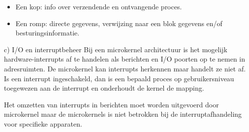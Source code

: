\begin{itemize}
\item Een kop: info over verzendende en ontvangende proces.
\item Een romp: directe gegevens, verwijzing naar een blok gegevens en/of besturingsinformatie.
\end{itemize}

c)	I/O en interruptbeheer
Bij een microkernel architectuur is het mogelijk hardware-interrupts af te handelen als berichten en I/O poorten op te nemen in adresruimten. De microkernel kan interrupts herkennen maar handelt ze niet af. Is een interrupt ingeschakeld, dan is een bepaald proces op gebruikersniveau toegewezen aan de interrupt en onderhoudt de kernel de mapping.

Het omzetten van interrupts in berichten moet worden uitgevoerd door microkernel maar de microkernels is niet betrokken bij de interruptafhandeling voor specifieke apparaten.
